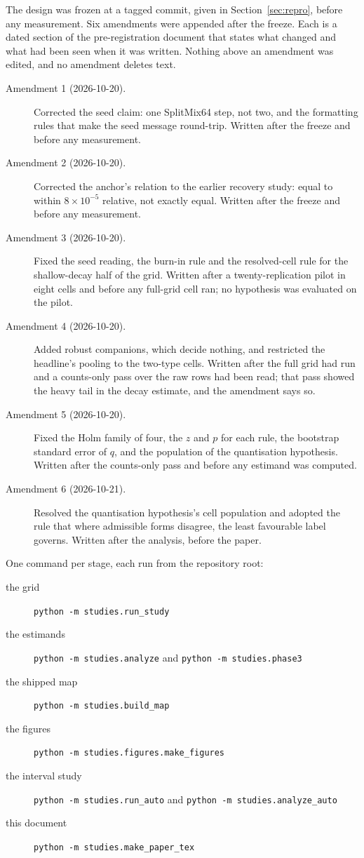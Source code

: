 The design was frozen at a tagged commit, given in Section~\ref{sec:repro}, before
any measurement. Six amendments were appended after the freeze. Each is a dated
section of the pre-registration document that states what changed and what had been
seen when it was written. Nothing above an amendment was edited, and no amendment
deletes text.

\begin{description}
\item[Amendment 1 (2026-10-20).] Corrected the seed claim: one SplitMix64
step, not two, and the formatting rules that make the seed message round-trip.
Written after the freeze and before any measurement.
\item[Amendment 2 (2026-10-20).] Corrected the anchor's relation to the earlier
recovery study: equal to within $8\times10^{-5}$ relative, not exactly equal.
Written after the freeze and before any measurement.
\item[Amendment 3 (2026-10-20).] Fixed the seed reading, the burn-in rule and the
resolved-cell rule for the shallow-decay half of the grid. Written after a
twenty-replication pilot in eight cells and before any full-grid cell ran; no
hypothesis was evaluated on the pilot.
\item[Amendment 4 (2026-10-20).] Added robust companions, which decide nothing, and
restricted the headline's pooling to the two-type cells. Written after the full grid
had run and a counts-only pass over the raw rows had been read; that pass showed the
heavy tail in the decay estimate, and the amendment says so.
\item[Amendment 5 (2026-10-20).] Fixed the Holm family of four, the $z$ and $p$ for
each rule, the bootstrap standard error of $q$, and the population of the
quantisation hypothesis. Written after the counts-only pass and before any estimand
was computed.
\item[Amendment 6 (2026-10-21).] Resolved the quantisation hypothesis's cell
population and adopted the rule that where admissible forms disagree, the least
favourable label governs. Written after the analysis, before the paper.
\end{description}

One command per stage, each run from the repository root:

\begin{description}
\item[the grid] \texttt{python -m studies.run\_study}
\item[the estimands] \texttt{python -m studies.analyze} and
  \texttt{python -m studies.phase3}
\item[the shipped map] \texttt{python -m studies.build\_map}
\item[the figures] \texttt{python -m studies.figures.make\_figures}
\item[the interval study] \texttt{python -m studies.run\_auto} and
  \texttt{python -m studies.analyze\_auto}
\item[this document] \texttt{python -m studies.make\_paper\_tex}
\end{description}
